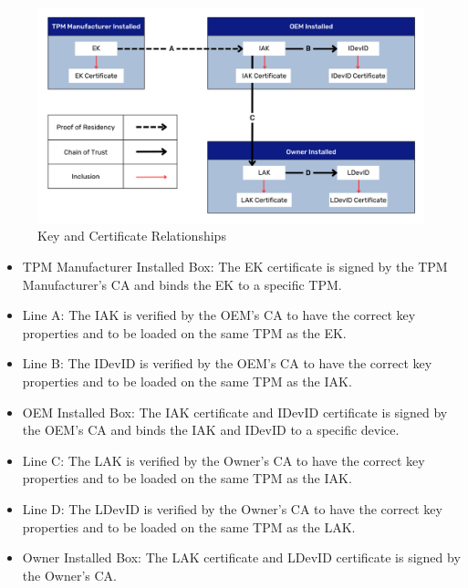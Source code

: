 \documentclass[runningheads]{llncs}
\begin{document}
\begin{figure}[h]
  \begin{centering}
  \includegraphics[width=\linewidth]{figures/certRelationships.png}
  \par\end{centering}
  \caption{Key and Certificate Relationships \cite{DevIDSpec-TCG}}
  \label{fig:cert_rel}
\end{figure}
\vspace{2em}
\begin{itemize}[itemsep=0pt,parsep=0pt,partopsep=0pt]
  \item \textsf{TPM Manufacturer Installed Box}: The EK certificate is signed by the TPM Manufacturer's CA and binds the EK to a specific TPM.
  \item \textsf{Line A}: The IAK is verified by the OEM's CA to have the correct key properties and to be loaded on the same TPM as the EK.
  \item \textsf{Line B}: The IDevID is verified by the OEM's CA to have the correct key properties and to be loaded on the same TPM as the IAK.
  \item \textsf{OEM Installed Box}: The IAK certificate and IDevID certificate is signed by the OEM's CA and binds the IAK and IDevID to a specific device.
  \item \textsf{Line C}: The LAK is verified by the Owner's CA to have the correct key properties and to be loaded on the same TPM as the IAK.
  \item \textsf{Line D}: The LDevID is verified by the Owner's CA to have the correct key properties and to be loaded on the same TPM as the LAK.
  \item \textsf{Owner Installed Box}: The LAK certificate and LDevID certificate is signed by the Owner's CA.
\end{itemize}
\end{document}
